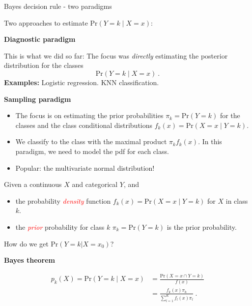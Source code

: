 \documentclass[10pt,ignorenonframetext,]{beamer}
\providecommand{\tightlist}{%
  \setlength{\itemsep}{0pt}\setlength{\parskip}{0pt}}
\begin{document}
\begin{frame}{Bayes decision rule - two paradigms}

\vspace{1mm}

Two approaches to estimate \(\text{Pr}(Y=k \mid X=x)\): \vspace{1mm}

\begin{block}{\textbf{Diagnostic paradigm}}

This is what we did so far: The focus was \emph{directly} estimating the
posterior distribution for the classes \[\text{Pr}(Y=k \mid X=x)\ .\]
\textbf{Examples:} Logistic regression. KNN classification.

\vspace{2mm}

\end{block}

\begin{block}{\textbf{Sampling paradigm}}

\begin{itemize}
\tightlist
\item
  The focus is on estimating the prior probabilities
  \(\pi_k=\text{Pr}(Y=k)\) for the classes and the class conditional
  distributions \(f_k(x)=\text{Pr}(X=x \mid Y=k)\).
\item
  We classify to the class with the maximal product \(\pi_k f_k(x)\). In
  this paradigm, we need to model the pdf for each class.
\item
  Popular: the multivariate normal distribution!
\end{itemize}

\end{block}

\end{frame}

\begin{frame}

Given a continuous \(X\) and categorical \(Y\), and

\begin{itemize}
\tightlist
\item
  the probability \emph{\textcolor{red}{density}} function
  \(f_k(x) = \text{Pr}(X=x \mid Y=k)\) for \(X\) in class \(k\).
\item
  the \emph{\textcolor{red}{prior}} probability for class \(k\)
  \(\pi_k = \text{Pr}(Y=k)\) is the prior probability.
\end{itemize}

How do we get \(\text{Pr}(Y=k | X=x_0)\)? \vspace{4mm}

\textbf{Bayes theorem} \vspace{-3mm}

\begin{align*}
p_k(X) = \text{Pr}(Y=k \mid X= x) &= 
\frac{\text{Pr}(X=x \cap Y=k)}{f(x)}\\
&= \frac{ f_k(x) \pi_k}{\sum_{l=1}^K  f_l(x) \pi_l}  \ .
\end{align*}

\end{frame}
\end{document}
